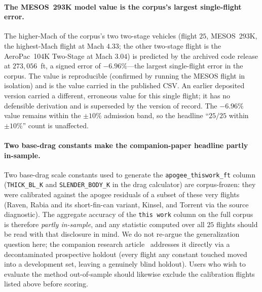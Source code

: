 \paragraph{The MESOS~293K model value is the corpus's largest single-flight error.}
The higher-Mach of the corpus's two two-stage vehicles (flight $25$, MESOS~293K,
the highest-Mach flight at Mach $4.33$; the other two-stage flight is the AeroPac~104K
Two-Stage at Mach $3.04$) is predicted by the archived code release at $273{,}056$~ft, a
signed error of $-6.96\%$---the largest single-flight error in the corpus. The
value is reproducible (confirmed by running the MESOS flight in isolation) and is
the value carried in the published CSV. An earlier deposited version
carried a different, erroneous value for this single flight; it has no defensible
derivation and is superseded by the version of record. The $-6.96\%$ value remains
within the $\pm10\%$ admission band, so the headline ``$25/25$ within $\pm10\%$''
count is unaffected.

\paragraph{Two base-drag constants make the companion-paper headline partly
in-sample.} Two base-drag scale constants used to generate the
\texttt{apogee\_thiswork\_ft} column (\texttt{THICK\_BL\_K} and
\texttt{SLENDER\_BODY\_K} in the drag calculator) are corpus-frozen: they were
calibrated against the apogee residuals of a subset of these very flights (Raven,
Rabia and its short-fin-can variant, Kinsel, and Torrent via the source
diagnostic). The aggregate accuracy of the \texttt{this work} column on the full
corpus is therefore \emph{partly in-sample}, and any statistic computed over all
$25$ flights should be read with that disclosure in mind. We do not re-argue the
generalization question here; the companion research article~\cite{yu2026jsr}
addresses it directly via a decontaminated prospective holdout (every flight any
constant touched moved into a development set, leaving a genuinely blind holdout).
Users who wish to evaluate the method out-of-sample should likewise exclude the
calibration flights listed above before scoring.
